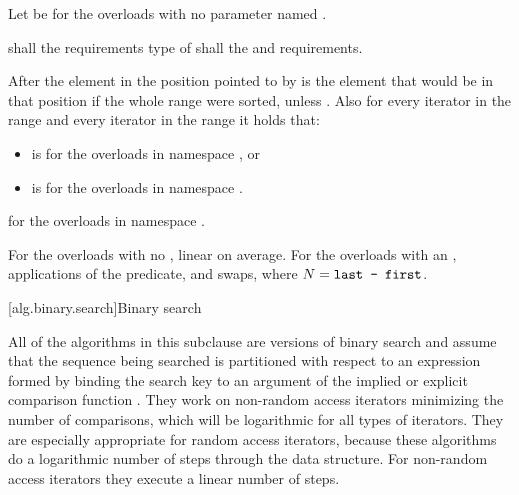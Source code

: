 \begin{itemdescr}
\begin{newnewblock}
\pnum
Let  be  for the overloads with no parameter
named .
\end{newnewblock}

\pnum
\requires
{}
 shall  the
 requirements type of  shall
 the
 and
 requirements.

\pnum
\effects
After
the element in the position pointed to by 
is the element that would be
in that position if the whole range were sorted, unless .
Also for every iterator
in the range
and every iterator
in the range
it holds that:
\begin{newnewblock}
\begin{itemize}
\item {} is  for the overloads in namespace
  , or
\item {} is
   for the overloads in namespace .
\end{itemize}
\end{newnewblock}

\begin{newnewblock}
\pnum
\returns {} for the overloads in namespace .
\end{newnewblock}

\pnum
\complexity
For the overloads with no , linear on average.
For the overloads with an ,  applications of
the predicate, and  swaps, where $N = \texttt{last - first}$.
\end{itemdescr}


[alg.binary.search]{Binary search}

\pnum
All of the algorithms in this subclause are versions of binary search
and assume that the sequence being searched is partitioned with respect to
an expression formed by binding the search key to an argument of the
implied or explicit comparison function .
They work on non-random access iterators minimizing the number of comparisons,
which will be logarithmic for all types of iterators.
They are especially appropriate for random access iterators,
because these algorithms do a logarithmic number of steps
through the data structure.
For non-random access iterators they execute a linear number of steps.

